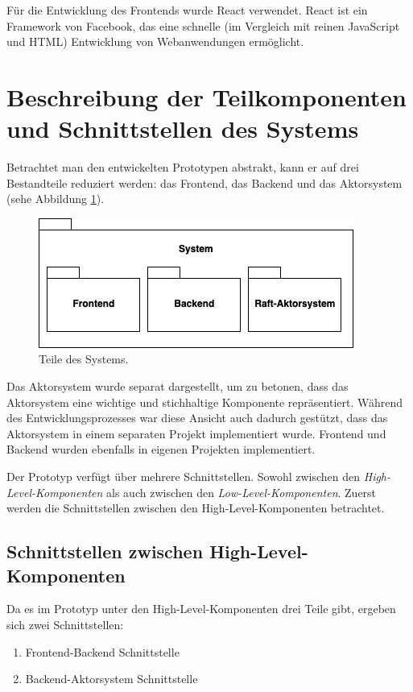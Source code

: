 Für die Entwicklung des Frontends wurde React verwendet. React ist ein Framework von Facebook, das eine schnelle (im Vergleich mit reinen JavaScript und HTML) Entwicklung von Webanwendungen ermöglicht.

\section{Beschreibung der Teilkomponenten und Schnittstellen des Systems}

Betrachtet man den entwickelten Prototypen abstrakt, kann er auf drei Bestandteile reduziert werden: das Frontend, das Backend und das Aktorsystem (sehe Abbildung \ref{fig:system}).

\begin{figure}
	\centering
	\includegraphics[width=0.7\linewidth]{images/7_system}
	\caption{Teile des Systems.}
	\label{fig:system}
\end{figure}

Das Aktorsystem wurde separat dargestellt, um zu betonen, dass das Aktorsystem eine wichtige und stichhaltige Komponente repräsentiert. Während des Entwicklungsprozesses war diese Ansicht auch dadurch gestützt, dass das Aktorsystem in einem separaten Projekt implementiert wurde. Frontend und Backend wurden ebenfalls in eigenen Projekten implementiert.

Der Prototyp verfügt über mehrere Schnittstellen. Sowohl zwischen den \textit{High-Level-Komponenten} als auch zwischen den \textit{Low-Level-Komponenten}. Zuerst werden die Schnittstellen zwischen den High-Level-Komponenten betrachtet.

\subsection{Schnittstellen zwischen High-Level-Komponenten}

Da es im Prototyp unter den High-Level-Komponenten drei Teile gibt, ergeben sich zwei Schnittstellen:

\begin{enumerate}
	\item Frontend-Backend Schnittstelle
	
	\item Backend-Aktorsystem Schnittstelle
\end{enumerate}

